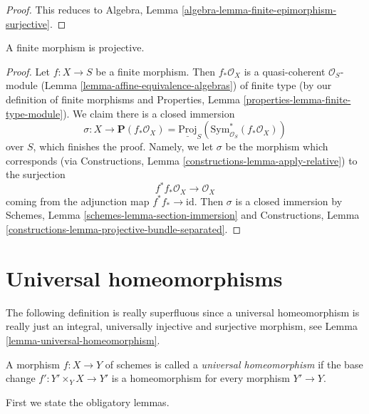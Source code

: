 \begin{proof}
This reduces to
Algebra, Lemma \ref{algebra-lemma-finite-epimorphism-surjective}.
\end{proof}

\begin{lemma}
\label{lemma-finite-projective}
A finite morphism is projective.
\end{lemma}

\begin{proof}
Let $f : X \to S$ be a finite morphism. Then $f_*\mathcal{O}_X$ is
a quasi-coherent $\mathcal{O}_S$-module
(Lemma \ref{lemma-affine-equivalence-algebras})
of finite type
(by our definition of finite morphisms and
Properties, Lemma \ref{properties-lemma-finite-type-module}).
We claim there is a closed immersion
$$
\sigma :
X
\longrightarrow
\mathbf{P}(f_*\mathcal{O}_X) =
\underline{\text{Proj}}_S(\text{Sym}^*_{\mathcal{O}_S}(f_*\mathcal{O}_X))
$$
over $S$, which finishes
the proof. Namely, we let $\sigma$ be the morphism which corresponds
(via Constructions, Lemma \ref{constructions-lemma-apply-relative})
to the surjection
$$
f^*f_*\mathcal{O}_X \longrightarrow \mathcal{O}_X
$$
coming from the adjunction map $f^*f_* \to \text{id}$. Then $\sigma$
is a closed immersion by
Schemes, Lemma \ref{schemes-lemma-section-immersion} and
Constructions, Lemma \ref{constructions-lemma-projective-bundle-separated}.
\end{proof}







\section{Universal homeomorphisms}
\label{section-universal-homeomorphisms}

\noindent
The following definition is really superfluous since a universal
homeomorphism is really just an integral, universally injective
and surjective morphism, see
Lemma \ref{lemma-universal-homeomorphism}.

\begin{definition}
\label{definition-universal-homeomorphism}
A morphism $f : X \to Y$ of schemes is called a {\it universal homeomorphism}
if the base change $f' : Y' \times_Y X \to Y'$ is a homeomorphism for
every morphism $Y' \to Y$.
\end{definition}

\noindent
First we state the obligatory lemmas.

